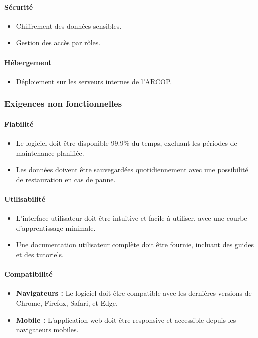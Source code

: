 \paragraph{Sécurité}
\begin{itemize}
    \item Chiffrement des données sensibles.
    \item Gestion des accès par rôles.
\end{itemize}

\paragraph{Hébergement}
\begin{itemize}
    \item Déploiement sur les serveurs internes de l'\ac{ARCOP}.
\end{itemize}
\subsubsection{Exigences non fonctionnelles}


\paragraph{Fiabilité}
\begin{itemize}
    \item Le logiciel doit être disponible 99.9\% du temps, excluant les périodes de maintenance planifiée.
    \item Les données doivent être sauvegardées quotidiennement avec une possibilité de restauration en cas de panne.
\end{itemize}

\paragraph{Utilisabilité}
\begin{itemize}
    \item L'interface utilisateur doit être intuitive et facile à utiliser, avec une courbe d'apprentissage minimale.
    \item Une documentation utilisateur complète doit être fournie, incluant des guides et des tutoriels.
\end{itemize}

\paragraph{Compatibilité}
\begin{itemize}
    \item \textbf{Navigateurs :} Le logiciel doit être compatible avec les dernières versions de Chrome, Firefox, Safari, et Edge.
    \item \textbf{Mobile :} L'application web doit être responsive et accessible depuis les navigateurs mobiles.
\end{itemize}

